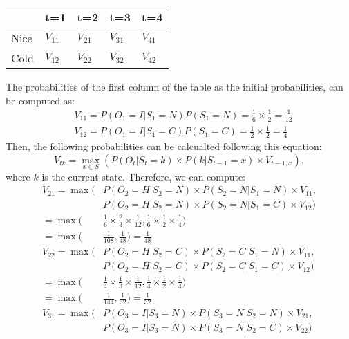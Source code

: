 \documentclass[11pt]{article}
\begin{document}
\begin{itemize}
\begin{table}[h]
\centering
\label{my-label}
\begin{tabular}{lllll}
\hline
\textbf{} & \textbf{t=1} & \textbf{t=2} & \textbf{t=3} & \textbf{t=4} \\ \hline
Nice      & $V_{11}$         &     $V_{21}$         &     $V_{31}$         &      $V_{41}$        \\ \hline
Cold      &       $V_{12}$       &     $V_{22}$         &     $V_{32}$         &     $V_{42}$         \\ \hline
\end{tabular}
\end{table}

The probabilities of the first column of the table as the initial probabilities, can be computed as:
\begin{align*}
& V_{11}=P(O_1=I|S_1=N)P(S_1=N)=\frac{1}{6}\times \frac{1}{2}=\frac{1}{12} \\
& V_{12}=P(O_1=I|S_1=C)P(S_1=C)=\frac{1}{2}\times \frac{1}{2}=\frac{1}{4}
\end{align*}
Then, the following probabilities can be calcualted following this equation:
\begin{equation*}
V_{tk}=\max_{x \in S}(P(O_t|S_t=k) \times P(k|S_{t-1}=x) \times V_{t-1,x}),
\end{equation*}
where $k$ is the current state. Therefore, we can compute:
\begin{align*}
V_{21} = \max (&P(O_2=H|S_2=N) \times P(S_2=N|S_1=N) \times V_{11}, \\
&P(O_2=H|S_2=N) \times P(S_2=N|S_1=C) \times V_{12} ) \\
= \max ( & \frac{1}{6} \times \frac{2}{3} \times \frac{1}{12}, \frac{1}{6} \times \frac{1}{2} \times \frac{1}{4}) \\
=\max ( & \frac{1}{108},\frac{1}{48})=\frac{1}{48} \\
V_{22} = \max (&P(O_2=H|S_2=C) \times P(S_2=C|S_1=N) \times V_{11}, \\
&P(O_2=H|S_2=C) \times P(S_2=C|S_1=C) \times V_{12} ) \\
= \max ( & \frac{1}{4} \times \frac{1}{3} \times \frac{1}{12}, \frac{1}{4} \times \frac{1}{2} \times \frac{1}{4}) \\
=\max ( & \frac{1}{144},\frac{1}{32})=\frac{1}{32} \\
V_{31} = \max (&P(O_3=I|S_3=N) \times P(S_3=N|S_2=N) \times V_{21}, \\
&P(O_3=I|S_3=N) \times P(S_3=N|S_2=C) \times V_{22} ) \\

\end{align*}
\end{itemize}
\end{document}
